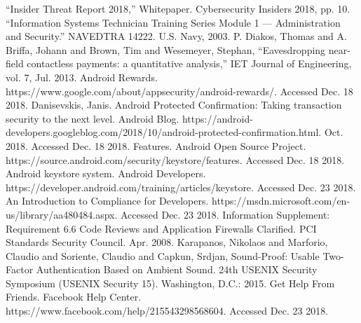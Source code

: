 \documentclass[letterpaper, 10 pt, conference]{ieeeconf}
\begin{document}
\begin{thebibliography}{99}

 ``Insider Threat Report 2018,'' Whitepaper. Cybersecurity Insiders 2018, pp. 10.
 ``Information Systems Technician Training Series Module 1 — Administration and Security.'' NAVEDTRA 14222. U.S. Navy, 2003.
 P. Diakos, Thomas and A. Briffa, Johann and Brown, Tim and Wesemeyer, Stephan, ``Eavesdropping near-field contactless payments: a quantitative analysis,'' IET Journal of Engineering, vol. 7, Jul. 2013.
 Android Rewards. https://www.google.com/about/appsecurity/android-rewards/. Accessed Dec. 18 2018.
 Danisevskis, Janis. Android Protected Confirmation: Taking transaction security to the next level. Android Blog. https://android-developers.googleblog.com/2018/10/android-protected-confirmation.html. Oct. 2018. Accessed Dec. 18 2018.
 Features. Android Open Source Project. https://source.android.com/security/keystore/features. Accessed Dec. 18 2018.
 Android keystore system. Android Developers. https://developer.android.com/training/articles/keystore. Accessed Dec. 23 2018.
 An Introduction to Compliance for Developers. https://msdn.microsoft.com/en-us/library/aa480484.aspx. Accessed Dec. 23 2018.
 Information Supplement: Requirement 6.6 Code Reviews and Application Firewalls Clarified. PCI Standards Security Council. Apr. 2008.
 Karapanos, Nikolaos and Marforio, Claudio and Soriente, Claudio and Capkun, Srdjan, Sound-Proof: Usable Two-Factor Authentication Based on Ambient Sound. 24th USENIX Security Symposium (USENIX Security 15). Washington, D.C.: 2015.
 Get Help From Friends. Facebook Help Center. https://www.facebook.com/help/215543298568604. Accessed Dec. 23 2018.


\end{thebibliography}
\end{document}
